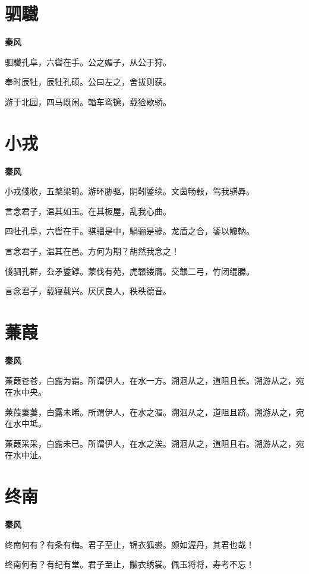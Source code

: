 \documentclass[12pt,a4paper]{ctexbook}
\begin{document}
\section{驷驖}
\textbf{秦风}\par\vspace{0.5em}
驷驖孔阜，六辔在手。公之媚子，从公于狩。\par
奉时辰牡，辰牡孔硕。公曰左之，舍拔则获。\par
游于北园，四马既闲。輶车鸾镳，载猃歇骄。\par

\section{小戎}
\textbf{秦风}\par\vspace{0.5em}
小戎俴收，五楘梁辀。游环胁驱，阴靷鋈续。文茵畅毂，驾我骐馵。\par
言念君子，温其如玉。在其板屋，乱我心曲。\par
四牡孔阜，六辔在手。骐骝是中，騧骊是骖。龙盾之合，鋈以觼軜。\par
言念君子，温其在邑。方何为期？胡然我念之！\par
俴驷孔群，厹矛鋈錞。蒙伐有苑，虎韔镂膺。交韔二弓，竹闭绲縢。\par
言念君子，载寝载兴。厌厌良人，秩秩德音。\par

\section{蒹葭}
\textbf{秦风}\par\vspace{0.5em}
蒹葭苍苍，白露为霜。所谓伊人，在水一方。溯洄从之，道阻且长。溯游从之，宛在水中央。\par
蒹葭萋萋，白露未晞。所谓伊人，在水之湄。溯洄从之，道阻且跻。溯游从之，宛在水中坻。\par
蒹葭采采，白露未已。所谓伊人，在水之涘。溯洄从之，道阻且右。溯游从之，宛在水中沚。\par

\section{终南}
\textbf{秦风}\par\vspace{0.5em}
终南何有？有条有梅。君子至止，锦衣狐裘。颜如渥丹，其君也哉！\par
终南何有？有纪有堂。君子至止，黻衣绣裳。佩玉将将，寿考不忘！\par
\end{document}
